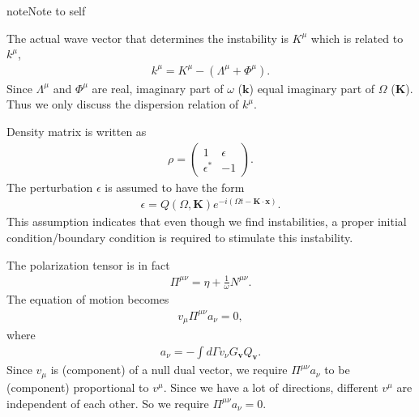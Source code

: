 \documentclass[letterpaper,12pt,english]{sphinxmanual}
\begin{document}
\begin{sphinxadmonition}{note}{Note to self}

The actual wave vector that determines the instability is \(K^\mu\) which is related to \(k^\mu\),
\begin{equation*}
\begin{split}k^\mu= K^\mu - (\Lambda^\mu + \Phi^\mu).\end{split}
\end{equation*}
Since \(\Lambda^\mu\) and \(\Phi^\mu\) are real, imaginary part of \(\omega\) (\(\mathbf k\)) equal imaginary part of \(\Omega\) (\(\mathbf K\)). Thus we only discuss the dispersion relation of \(k^\mu\).

Density matrix is written as
\begin{equation*}
\begin{split}\rho = \begin{pmatrix}
1 & \epsilon \\
\epsilon^* & -1
\end{pmatrix}.\end{split}
\end{equation*}
The perturbation \(\epsilon\) is assumed to have the form
\begin{equation*}
\begin{split}\epsilon = Q(\Omega, \mathbf K) e^{ -i( \Omega t - \mathbf K \cdot \mathbf x ) }.\end{split}
\end{equation*}
This assumption indicates that even though we find instabilities, a proper initial condition/boundary condition is required to stimulate this instability.
\end{sphinxadmonition}

The polarization tensor is in fact
\begin{equation*}
\begin{split}\Pi^{\mu\nu} = \eta + \frac{1}{\omega}N^{\mu\nu}.\end{split}
\end{equation*}
The equation of motion becomes
\begin{equation*}
\begin{split}v_\mu \Pi^{\mu\nu} a_\nu =0 ,\end{split}
\end{equation*}
where
\begin{equation*}
\begin{split}a_\nu = - \int d\Gamma v_\nu G_{\mathbf v} Q_{\mathbf v}.\end{split}
\end{equation*}
Since \(v_\mu\) is (component) of a null dual vector, we require \(\Pi^{\mu\nu} a_\nu\) to be (component) proportional to \(v^\mu\). Since we have a lot of directions, different \(v^\mu\) are independent of each other. So we require \(\Pi^{\mu\nu} a_\nu=0\).
\end{document}
